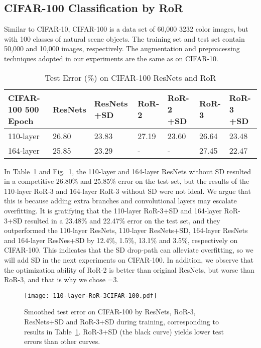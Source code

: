 \documentclass[journal]{IEEEtran}
\begin{document}
\subsection{CIFAR-100 Classification by RoR}
Similar to CIFAR-10, CIFAR-100 is a data set of 60,000 3232 color images, but with 100 classes of natural scene objects. The training set and test set contain 50,000 and 10,000 images, respectively. The augmentation and preprocessing techniques adopted in our experiments are the same as on CIFAR-10.
\begin{table}[!t]
\renewcommand{\arraystretch}{1.3}
\caption{Test Error (\%) on CIFAR-100 ResNets and RoR}
\label{tab:cifar100RoR}
\centering
\begin{tabular}{|p{1.35cm}|p{0.7cm}|p{0.8cm}|p{0.7cm}|p{0.8cm}|p{0.7cm}|p{0.8cm}|}
\hline
CIFAR-100 500 Epoch          &ResNets             &ResNets +SD  &RoR-2     &RoR-2 +SD  &RoR-3     &RoR-3 +SD  \\ \hline\hline
110-layer                    &26.80               &23.83       &27.19     &23.60     &26.64     &23.48   \\\hline
164-layer                    &25.85               &23.29       &-         &-         &27.45     &22.47 \\\hline
\end{tabular}
\end{table}
\par 
In Table~\ref{tab:cifar100RoR} and Fig.~\ref{fig:RoR-3100}, the 110-layer and 164-layer ResNets without SD resulted in a competitive 26.80\% and 25.85\% error on the test set, but the results of the 110-layer RoR-3 and 164-layer RoR-3 without SD were not ideal. We argue that this is because adding extra branches and convolutional layers may escalate overfitting. It is gratifying that the 110-layer RoR-3+SD and 164-layer RoR-3+SD resulted in a 23.48\% and 22.47\% error on the test set, and they outperformed the 110-layer ResNets, 110-layer ResNets+SD, 164-layer ResNets and 164-layer ResNes+SD by 12.4\%, 1.5\%, 13.1\% and 3.5\%, respectively on CIFAR-100. This indicates that the SD drop-path can alleviate overfitting, so we will add SD in the next experiments on CIFAR-100. In addition, we observe that the optimization ability of RoR-2 is better than original ResNets, but worse than RoR-3, and that is why we chose =3.
\begin{figure}
\centering
\texttt{[image: 110-layer-RoR-3CIFAR-100.pdf]}
\caption{Smoothed test error on CIFAR-100 by ResNets, RoR-3, ResNets+SD and RoR-3+SD during training, corresponding to results in Table~\ref{tab:cifar100RoR}. RoR-3+SD (the black curve) yields lower test errors than other curves.}
\label{fig:RoR-3100}
\end{figure} 
\end{document}
